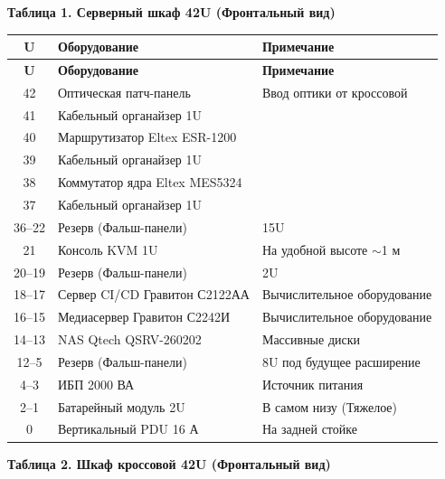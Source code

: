\documentclass{bmstu}
\begin{document}
\textbf{Таблица 1. Серверный шкаф 42U (Фронтальный вид)}

\begin{small}
\begin{longtable}{|c|l|l|}
\hline
\textbf{U} & \textbf{Оборудование} & \textbf{Примечание} \\ \hline
\endfirsthead
\hline
\textbf{U} & \textbf{Оборудование} & \textbf{Примечание} \\ \hline
\endhead
42 & Оптическая патч-панель & Ввод оптики от кроссовой \\ \hline
41 & Кабельный органайзер 1U & \\ \hline
40 & Маршрутизатор Eltex ESR-1200 & \\ \hline
39 & Кабельный органайзер 1U & \\ \hline
38 & Коммутатор ядра Eltex MES5324 & \\ \hline
37 & Кабельный органайзер 1U & \\ \hline
36--22 & Резерв (Фальш-панели) & 15U \\ \hline
21 & Консоль KVM 1U & На удобной высоте $\sim$1 м \\ \hline
20--19 & Резерв (Фальш-панели) & 2U \\ \hline
18--17 & Сервер CI/CD Гравитон С2122АА & Вычислительное оборудование \\ \hline
16--15 & Медиасервер Гравитон С2242И & Вычислительное оборудование \\ \hline
14--13 & NAS Qtech QSRV-260202 & Массивные диски \\ \hline
12--5 & Резерв (Фальш-панели) & 8U под будущее расширение \\ \hline
4--3 & ИБП 2000 ВА & Источник питания \\ \hline
2--1 & Батарейный модуль 2U & В самом низу (Тяжелое) \\ \hline
0 & Вертикальный PDU 16 А & На задней стойке \\ \hline
\end{longtable}
\end{small}

\textbf{Таблица 2. Шкаф кроссовой 42U (Фронтальный вид)}
\end{document}

